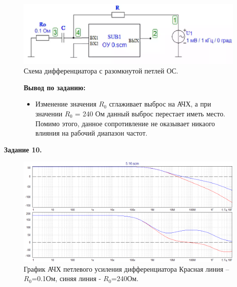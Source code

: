 \documentclass[a4paper,14pt]{extarticle}
\begin{document}
    \begin{figure}
        \begin{center}
            \includegraphics[scale=0.5]{24.png}
        \end{center}
        \vspace{-0.7cm}
        \caption{Схема дифференциатора с разомкнутой петлей ОС.}
    \end{figure}
    
    \begin{figure}
        \textbf{Вывод по заданию:}

        \begin{itemize}
            \item Изменение значения $R_0$ сглаживает выброс на АЧХ, а при значении $R_0$ = 240 Ом данный выброс перестает иметь место. Помимо этого, данное сопротивление не оказывает никаого влияния на рабочий диапазон частот.
        \end{itemize}
    \end{figure}
  
    \newpage
    \begin{center}
        \textbf{Задание 10.}
    \end{center}
    \vspace{-0.5cm}
    \begin{figure}[h!]
        \captionsetup{justification=centering}
        \begin{center}
            \includegraphics[scale=0.5]{25.png}
        \end{center}
        \vspace{-0.7cm}
        \caption{График АЧХ петлевого усиления дифференциатора Красная линия – $R_0$=0.1Ом, синяя линия - $R_0$=240Ом.}
    \end{figure}
 
\end{document}
